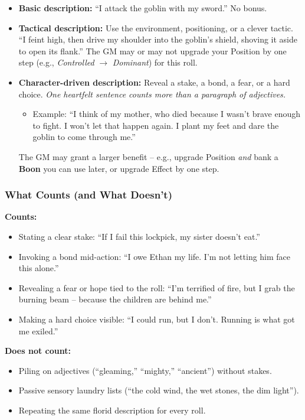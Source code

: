 \begin{itemize}
  \item \textbf{Basic description:} ``I attack the goblin with my sword.''
        No bonus.

  \item \textbf{Tactical description:} Use the environment, positioning, or a
        clever tactic. ``I feint high, then drive my shoulder into the goblin's
        shield, shoving it aside to open its flank.''
        The GM may or may not upgrade your Position by one step (e.g., \textit{Controlled}
        $\rightarrow$ \textit{Dominant}) for this roll.

  \item \textbf{Character-driven description:} Reveal a stake, a bond, a fear,
        or a hard choice. \emph{One heartfelt sentence counts more than a
        paragraph of adjectives.}
        \begin{itemize}
          \item Example: ``I think of my mother, who died because I wasn't brave
                enough to fight. I won't let that happen again. I plant my feet
                and dare the goblin to come through me.''
        \end{itemize}
        The GM may grant a larger benefit -- e.g., upgrade Position \emph{and}
        bank a \textbf{Boon} you can use later, or upgrade Effect by one step.
\end{itemize}

\subsubsection*{What Counts (and What Doesn't)}
\textbf{Counts:}
\begin{itemize}
  \item Stating a clear stake: ``If I fail this lockpick, my sister doesn't eat.''
  \item Invoking a bond mid-action: ``I owe Ethan my life. I'm not letting him
        face this alone.''
  \item Revealing a fear or hope tied to the roll: ``I'm terrified of fire, but
        I grab the burning beam -- because the children are behind me.''
  \item Making a hard choice visible: ``I could run, but I don't. Running is what
        got me exiled.''
\end{itemize}
\textbf{Does not count:}
\begin{itemize}
  \item Piling on adjectives (``gleaming,'' ``mighty,'' ``ancient'') without stakes.
  \item Passive sensory laundry lists (``the cold wind, the wet stones, the dim light'').
  \item Repeating the same florid description for every roll.
\end{itemize}

